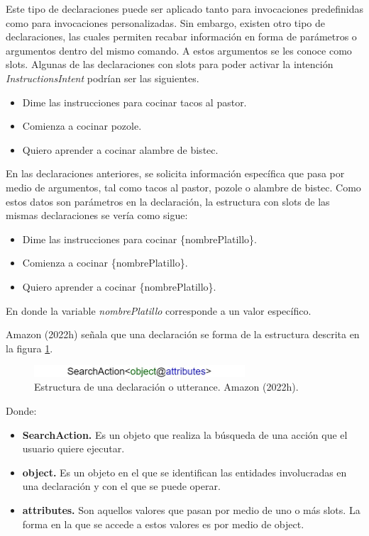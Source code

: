 Este tipo de declaraciones puede ser aplicado tanto para invocaciones predefinidas como para invocaciones personalizadas. Sin embargo, existen otro tipo de declaraciones, las cuales permiten recabar información en forma de parámetros o argumentos dentro del mismo comando. A estos argumentos se les conoce como slots. Algunas de las declaraciones con slots para poder activar la intención \textit{InstructionsIntent} podrían ser las siguientes.

\begin{itemize}
  \item Dime las instrucciones para cocinar tacos al pastor.
  \item Comienza a cocinar pozole.
  \item Quiero aprender a cocinar alambre de bistec.
\end{itemize}

En las declaraciones anteriores, se solicita información específica que pasa por medio de argumentos, tal como tacos al pastor, pozole o alambre de bistec. Como estos datos son parámetros en la declaración, la estructura con slots de las mismas declaraciones se vería como sigue:

\begin{itemize}
  \item Dime las instrucciones para cocinar \{nombrePlatillo\}.
  \item Comienza a cocinar \{nombrePlatillo\}.
  \item Quiero aprender a cocinar \{nombrePlatillo\}.
\end{itemize}

En donde la variable \textit{nombrePlatillo} corresponde a un valor específico.

Amazon (2022h) señala que una declaración se forma de la estructura descrita en la figura \ref{fig:48}.

\begin{figure}
  \centering
  \includegraphics[width=0.70\textwidth]{Cap4/Figuras/Estructura de Declaraciones.jpg}
  \caption{Estructura de una declaración o utterance. Amazon (2022h).}
  \label{fig:48}
\end{figure}

Donde:

\begin{itemize}
  \item \textbf{SearchAction.} Es un objeto que realiza la búsqueda de una acción que el usuario quiere ejecutar.
  \item \textbf{object.} Es un objeto en el que se identifican las entidades involucradas en una declaración y con el que se puede operar.
  \item \textbf{attributes.} Son aquellos valores que pasan por medio de uno o más slots. La forma en la que se accede a estos valores es por medio de object.
\end{itemize}


